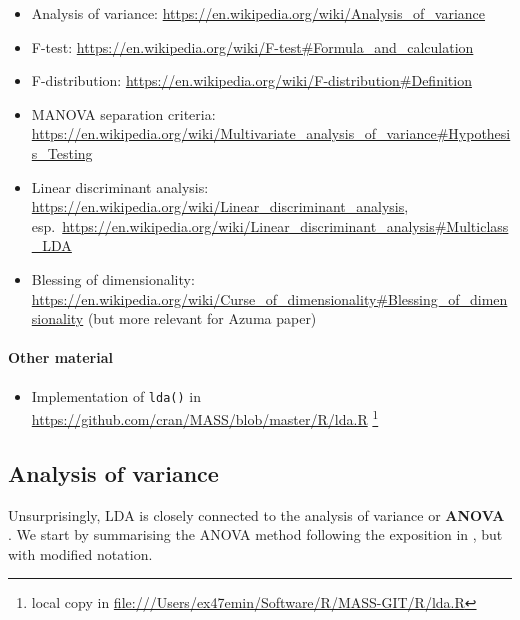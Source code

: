 \documentclass[a4paper]{article}
\begin{document}
\begin{itemize}
\item Analysis of variance: \url{https://en.wikipedia.org/wiki/Analysis_of_variance}
\item F-test: \url{https://en.wikipedia.org/wiki/F-test#Formula_and_calculation}
\item F-distribution: \url{https://en.wikipedia.org/wiki/F-distribution#Definition}
\item MANOVA separation criteria: \url{https://en.wikipedia.org/wiki/Multivariate_analysis_of_variance#Hypothesis_Testing}
\item Linear discriminant analysis: \url{https://en.wikipedia.org/wiki/Linear_discriminant_analysis}, esp.\ \url{https://en.wikipedia.org/wiki/Linear_discriminant_analysis#Multiclass_LDA}
\item Blessing of dimensionality: \url{https://en.wikipedia.org/wiki/Curse_of_dimensionality#Blessing_of_dimensionality} (but more relevant for Azuma paper)
\end{itemize}

\paragraph{Other material}

\begin{itemize}
\item Implementation of \texttt{lda()} in \url{https://github.com/cran/MASS/blob/master/R/lda.R}%
  \footnote{local copy in \url{file:///Users/ex47emin/Software/R/MASS-GIT/R/lda.R}}
\end{itemize}


\subsection{Analysis of variance}
\label{sec:lda:anova}

Unsurprisingly, LDA \citep{Fisher:36} is closely connected to the analysis of variance or \textbf{ANOVA} \citep{Fisher:25}. We start by summarising the ANOVA method following the exposition in \citet[754--761]{DeGroot:Schervish:12}, but with modified notation.
\end{document}
